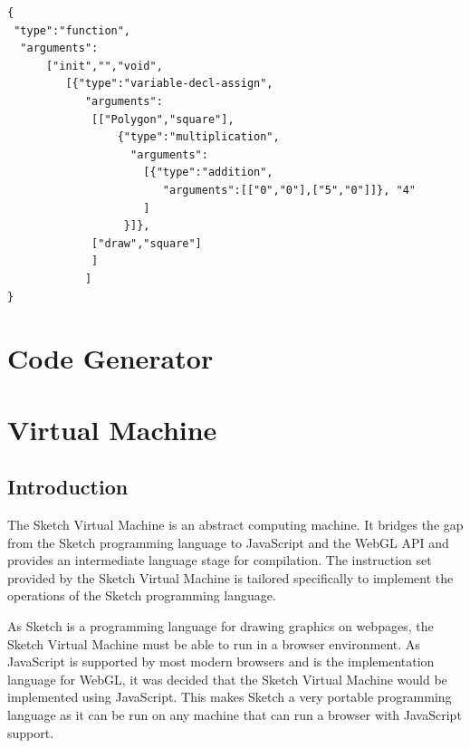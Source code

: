 \documentclass{l3proj}
\begin{document}
\lstset{%
      basicstyle=\ttfamily\footnotesize\bfseries,
      frame=single,
      xleftmargin=.1\textwidth, xrightmargin=.1\textwidth,
      captionpos=b,
      tabsize=4,
      language=json
    }
\begin{lstlisting}[caption={Sample AST produced by the parser },label={lst:ast-example}]
{
 "type":"function",
  "arguments":
      ["init","","void",
         [{"type":"variable-decl-assign",
            "arguments":
             [["Polygon","square"],
                 {"type":"multiplication",
                   "arguments":
                     [{"type":"addition",
                        "arguments":[["0","0"],["5","0"]]}, "4"
                     ]
                  }]},
             ["draw","square"]
             ]
            ]
}

\end{lstlisting}
\section{Code Generator}
\label{arch-gen}

\section{Virtual Machine}
\label{arch-abs}

\subsection{Introduction}
The Sketch Virtual Machine is an abstract computing machine. It bridges the gap from the Sketch programming language to JavaScript and the WebGL API and provides an intermediate language stage for compilation. The instruction set provided by the Sketch Virtual Machine is tailored specifically to implement the operations of the Sketch programming language.

As Sketch is a programming language for drawing graphics on webpages, the Sketch Virtual Machine must be able to run in a browser environment. As JavaScript is supported by most modern browsers and is the implementation language for WebGL, it was decided that the Sketch Virtual Machine would be implemented using JavaScript. This makes Sketch a very portable programming language as it can be run on any machine that can run a browser with JavaScript support.
\end{document}

